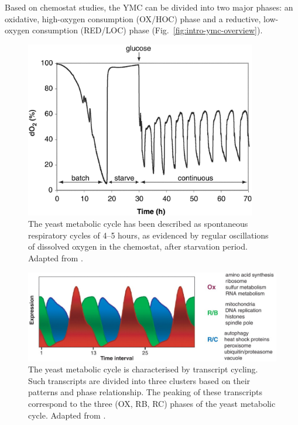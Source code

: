 Based on chemostat studies,
the YMC can be divided into two major phases: an oxidative, high-oxygen consumption (OX/HOC) phase and a reductive, low-oxygen consumption (RED/LOC) phase (Fig.\ \ref{fig:intro-ymc-overview}).

\begin{figure}
  \centering
  \includegraphics[width=0.9\textwidth]{tuLogicYeastMetabolic2005_1}
  \caption[
    The yeast metabolic cycle has been described as spontaneous respiratory cycles
  ]{
    The yeast metabolic cycle has been described as spontaneous respiratory cycles of 4--5 hours, as evidenced by regular oscillations of dissolved oxygen in the chemostat, after starvation period.
    Adapted from \textcite{tuLogicYeastMetabolic2005}.}
  \label{fig:intro-ymc-tu-oxygen}
\end{figure}

\begin{figure}
  \centering
  \includegraphics[width=1.0\textwidth]{tuLogicYeastMetabolic2005_3d_adapted}
  \caption[
    The yeast metabolic cycle is characterised by transcript cycling
  ]{
    The yeast metabolic cycle is characterised by transcript cycling.
    Such transcripts are divided into three clusters based on their patterns and phase relationship.
    The peaking of these transcripts correspond to the three (OX, RB, RC) phases of the yeast metabolic cycle.
    Adapted from \textcite{tuLogicYeastMetabolic2005}.}
  \label{fig:intro-ymc-tu-transcripts}
\end{figure}

